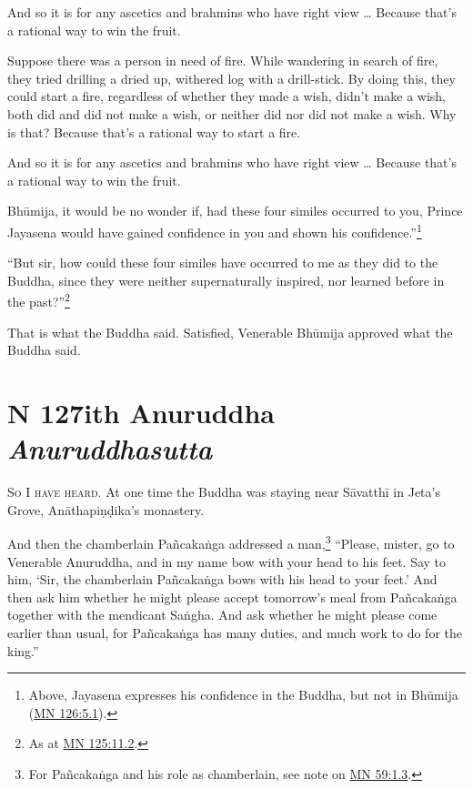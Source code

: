 \documentclass[12pt,openany]{book}%
\newcommand*{\suttatitleacronym}[1]{\smaller[2]{#1}\vspace*{.3em}}
\newcommand*{\suttatitletranslation}[1]{\linebreak{#1}}
\newcommand*{\suttatitleroot}[1]{\linebreak\smaller[2]\itshape{#1}}
\newcommand*{\tocacronym}[1]{\hspace*{-3.3em}{#1}\quad}
\newcommand*{\toctranslation}[1]{#1}
\newcommand*{\tocroot}[1]{(\textit{#1})}
\newcommand*{\scevam}[1]{\textsc{#1}}
\begin{document}
And so it is for any ascetics and brahmins who have right view … Because that’s a rational way to win the fruit. 

Suppose there was a person in need of fire. While wandering in search of fire, they tried drilling a dried up, withered log with a drill-stick. By doing this, they could start a fire, regardless of whether they made a wish, didn’t make a wish, both did and did not make a wish, or neither did nor did not make a wish. Why is that? Because that’s a rational way to start a fire. 

And so it is for any ascetics and brahmins who have right view … Because that’s a rational way to win the fruit. 

\textsanskrit{Bhūmija}, it would be no wonder if, had these four similes occurred to you, Prince Jayasena would have gained confidence in you and shown his confidence.”\footnote{Above, Jayasena expresses his confidence in the Buddha, but not in \textsanskrit{Bhūmija} (\href{https://suttacentral.net/mn126/en/sujato\#5.1}{MN 126:5.1}). } 

“But sir, how could these four similes have occurred to me as they did to the Buddha, since they were neither supernaturally inspired, nor learned before in the past?”\footnote{As at \href{https://suttacentral.net/mn125/en/sujato\#11.2}{MN 125:11.2}. } 

That is what the Buddha said. Satisfied, Venerable \textsanskrit{Bhūmija} approved what the Buddha said. 

%
\section*{{\suttatitleacronym MN 127}{\suttatitletranslation With Anuruddha }{\suttatitleroot Anuruddhasutta}}
\addcontentsline{toc}{section}{\tocacronym{MN 127} \toctranslation{With Anuruddha } \tocroot{Anuruddhasutta}}

\scevam{So I have heard. }At one time the Buddha was staying near \textsanskrit{Sāvatthī} in Jeta’s Grove, \textsanskrit{Anāthapiṇḍika}’s monastery. 

And then the chamberlain \textsanskrit{Pañcakaṅga} addressed a man,\footnote{For \textsanskrit{Pañcakaṅga} and his role as chamberlain, see note on \href{https://suttacentral.net/mn59/en/sujato\#1.3}{MN 59:1.3}. } “Please, mister, go to Venerable Anuruddha, and in my name bow with your head to his feet. Say to him, ‘Sir, the chamberlain \textsanskrit{Pañcakaṅga} bows with his head to your feet.’ And then ask him whether he might please accept tomorrow’s meal from \textsanskrit{Pañcakaṅga} together with the mendicant \textsanskrit{Saṅgha}. And ask whether he might please come earlier than usual, for \textsanskrit{Pañcakaṅga} has many duties, and much work to do for the king.” 
\end{document}
